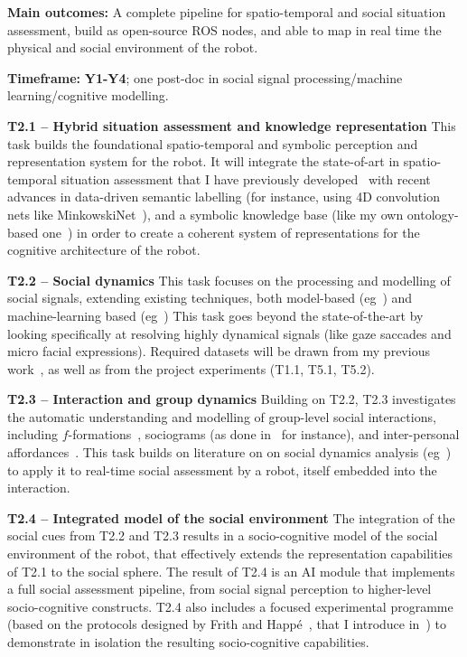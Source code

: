 \documentclass[11pt,a4paper]{report}
\begin{document}
\begin{framed}
    \textbf{Main outcomes:} A complete pipeline for
spatio-temporal and social situation assessment, build as open-source ROS nodes,
and able to map in real time the physical and social environment of the robot.

    \textbf{Timeframe:} \textbf{Y1-Y4}; one post-doc in social
signal processing/machine learning/cognitive modelling.
\end{framed}

\textbf{T2.1 -- Hybrid situation assessment and knowledge representation} This
task builds the foundational spatio-temporal and symbolic perception and
representation system for the robot. It will integrate the state-of-art in
spatio-temporal situation assessment that I have previously
developed~\cite{lemaignan2018underworlds, sallami2019simulation} with recent
advances in data-driven semantic labelling (for instance, using 4D convolution
nets like MinkowskiNet~\cite{choy20194d}), and a symbolic knowledge base (like
my own ontology-based one~\cite{lemaignan2010oro}) in order to create a coherent
system of representations for the cognitive architecture of the robot.

\textbf{T2.2 -- Social dynamics} This task focuses on the processing and
modelling of social signals, extending existing techniques, both model-based
(eg~\cite{lemaignan2016realtime,others}) and machine-learning based
(eg~\cite{chetouani,others}) This task goes beyond the state-of-the-art by
looking specifically at resolving highly dynamical signals (like gaze saccades
and micro facial expressions). Required datasets will be drawn from my previous
work~\cite{lemaignan2018pinsoro}, as well as from the project experiments (T1.1,
T5.1, T5.2).

\textbf{T2.3 -- Interaction and group dynamics} Building on T2.2, T2.3
investigates the automatic understanding and modelling of group-level social
interactions, including $f$-formations~\cite{marshall2011using}, sociograms (as
done in~\cite{garcia2016hybrid} for instance), and inter-personal
affordances~\cite{pandey2013affordance}. This task builds on literature on on
social dynamics analysis (eg~\cite{jermann2009physical, martinez2019collocated})
to apply it to real-time social assessment by a robot, itself embedded into the
interaction.

\textbf{T2.4 -- Integrated model of the social environment} The integration of
the social cues from T2.2 and T2.3 results in a socio-cognitive model of the
social environment of the robot, that effectively extends the representation
capabilities of T2.1 to the social sphere. The result of T2.4 is an AI module
that implements a full social assessment pipeline, from social signal perception
to higher-level socio-cognitive constructs. T2.4 also includes a
focused experimental programme (based on the protocols designed by Frith and
Happé~\cite{frith1994autism}, that I introduce in~\cite{lemaignan2015mutual}) to
demonstrate in isolation the resulting socio-cognitive capabilities.
\end{document}
